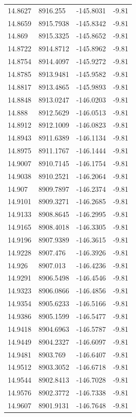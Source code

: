 \begin{table}[H]
\begin{tabular}{llll}
14.8627 & 8916.255 & -145.8031 & -9.81 \\
14.8659 & 8915.7938 & -145.8342 & -9.81 \\
14.869 & 8915.3325 & -145.8652 & -9.81 \\
14.8722 & 8914.8712 & -145.8962 & -9.81 \\
14.8754 & 8914.4097 & -145.9272 & -9.81 \\
14.8785 & 8913.9481 & -145.9582 & -9.81 \\
14.8817 & 8913.4865 & -145.9893 & -9.81 \\
14.8848 & 8913.0247 & -146.0203 & -9.81 \\
14.888 & 8912.5629 & -146.0513 & -9.81 \\
14.8912 & 8912.1009 & -146.0823 & -9.81 \\
14.8943 & 8911.6389 & -146.1134 & -9.81 \\
14.8975 & 8911.1767 & -146.1444 & -9.81 \\
14.9007 & 8910.7145 & -146.1754 & -9.81 \\
14.9038 & 8910.2521 & -146.2064 & -9.81 \\
14.907 & 8909.7897 & -146.2374 & -9.81 \\
14.9101 & 8909.3271 & -146.2685 & -9.81 \\
14.9133 & 8908.8645 & -146.2995 & -9.81 \\
14.9165 & 8908.4018 & -146.3305 & -9.81 \\
14.9196 & 8907.9389 & -146.3615 & -9.81 \\
14.9228 & 8907.476 & -146.3926 & -9.81 \\
14.926 & 8907.013 & -146.4236 & -9.81 \\
14.9291 & 8906.5498 & -146.4546 & -9.81 \\
14.9323 & 8906.0866 & -146.4856 & -9.81 \\
14.9354 & 8905.6233 & -146.5166 & -9.81 \\
14.9386 & 8905.1599 & -146.5477 & -9.81 \\
14.9418 & 8904.6963 & -146.5787 & -9.81 \\
14.9449 & 8904.2327 & -146.6097 & -9.81 \\
14.9481 & 8903.769 & -146.6407 & -9.81 \\
14.9512 & 8903.3052 & -146.6718 & -9.81 \\
14.9544 & 8902.8413 & -146.7028 & -9.81 \\
14.9576 & 8902.3772 & -146.7338 & -9.81 \\
14.9607 & 8901.9131 & -146.7648 & -9.81 \\

\end{tabular}
\end{table}
